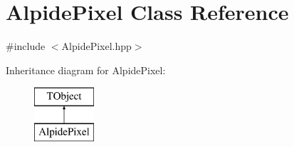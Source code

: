 \hypertarget{class_alpide_pixel}{}\section{Alpide\+Pixel Class Reference}
\label{class_alpide_pixel}


{\ttfamily \#include $<$Alpide\+Pixel.\+hpp$>$}

Inheritance diagram for Alpide\+Pixel\+:\begin{figure}[H]
\begin{center}
\leavevmode
\includegraphics[height=2.000000cm]{class_alpide_pixel}
\end{center}
\end{figure}

